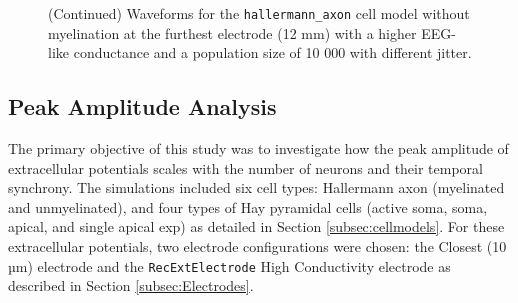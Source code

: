 \documentclass[final, a4paper,masters,en,listoffigures,listoftables,norwegiandates]{NMBU}
\begin{document}
\begin{figure}[htbp]
    \centering
    \vspace*{-3cm}
    \caption{(Continued) Waveforms for the \texttt{hallermann\_axon} cell model without myelination at the furthest electrode (12 mm) with a higher EEG-like conductance and a population size of 10 000 with different jitter.}  
    \label{fig:axonjitters2eeg}
\end{figure}

\newpage
\subsection{Peak Amplitude Analysis}\label{subsec:PeakAmplitude}

The primary objective of this study was to investigate how the peak amplitude of extracellular potentials scales with the number of neurons and their temporal synchrony. The simulations included six cell types: Hallermann axon (myelinated and unmyelinated), and four types of Hay pyramidal cells (active soma, soma, apical, and single apical exp) as detailed in Section \ref{subsec:cellmodels}. For these extracellular potentials, two electrode configurations were chosen: the Closest (10 µm) electrode and the \texttt{RecExtElectrode} High Conductivity electrode as described in Section \ref{subsec:Electrodes}.
\end{document}
